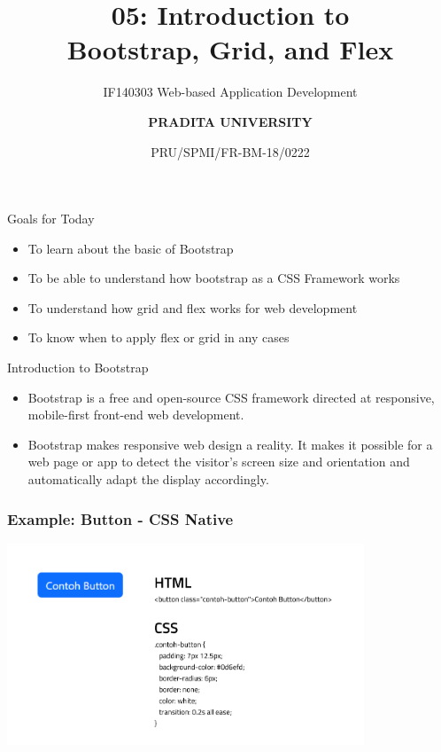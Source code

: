 \documentclass[aspectratio=169, table]{beamer}
\subtitle{IF140303 Web-based Application Development}
\title{\huge {\textbf{05: Introduction to\\Bootstrap, Grid, and Flex}}}
\date[Serial]{\scriptsize {PRU/SPMI/FR-BM-18/0222}}
\author[Pradita]{\small {\textbf{PRADITA UNIVERSITY}}}
\begin{document}
\begin{frame}
    \titlepage
\end{frame}

\begin{frame}{Goals for Today}
    \vskip-1cm
    \begin{itemize}
        \item To learn about the basic of Bootstrap
        \item To be able to understand how bootstrap as a CSS Framework works
        \item To understand how grid and flex works for web development
        \item To know when to apply flex or grid in any cases
    \end{itemize}
\end{frame}

\begin{frame}{Introduction to Bootstrap}
    \vskip-0cm
    \begin{itemize}
        \item Bootstrap is a free and open-source CSS framework directed at responsive, mobile-first front-end web development.
        \item Bootstrap makes responsive web design a reality. It makes it possible for a web page or app to detect the visitor's screen size and orientation and automatically adapt the display accordingly.
    \end{itemize}
\end{frame}

\begin{frame}[fragile]
	\frametitle{Example: Button - CSS Native}
	\vskip1cm
	\begin{center}
		\includegraphics[width=0.8\textwidth]{classFiles/button-css-native.png}
	\end{center}
\end{frame}
\end{document}
